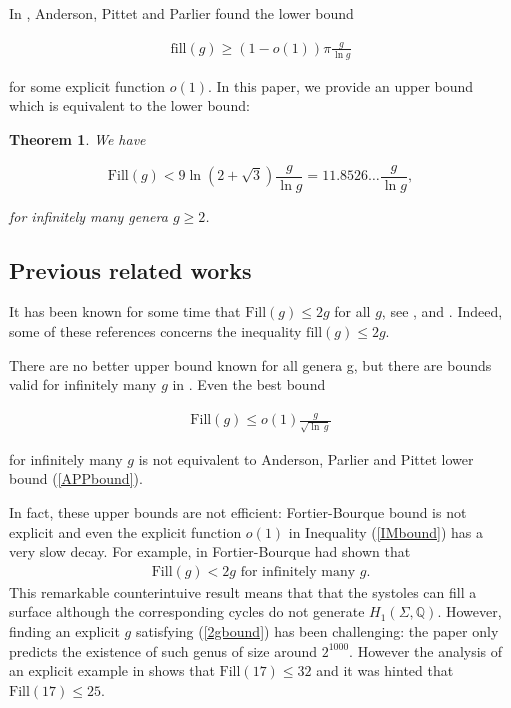 \documentclass[12pt]{amsart}
\newcommand{\Q}{\mathbb{Q}}
\renewcommand{\fill}{\mathrm{fill}}
\newcommand{\Fill}{\mathrm{Fill}}
\newtheorem{thm}[lemma]{Theorem}
\begin{document}
In \cite{APP}, Anderson, Pittet and Parlier found the lower bound
 
\begin{align}
\fill(g)\geq (1-o(1)) \pi \frac{g}{\ln g} \label{APPbound}
\end{align}

\noindent for some explicit function $o(1)$. In this
paper, we provide an upper bound which is equivalent to the lower bound:

\begin{thm}\label{main} We have

$$\Fill(g)<9\ln(2+\sqrt{3}) \frac{g}{\ln g}=11.8526\ldots \frac{g}{\ln g},$$

for infinitely many genera $g\geq 2$.
\end{thm}


\subsection*{{ Previous related works}}

It has been known for some time that  $\Fill(g)\leq 2g$ for all $g$,
see \cite{SS},\cite{APP} and \cite{Sanki}. Indeed,   some of these references concerns the inequality  
$\fill(g)\leq 2g$.  

There are no better upper  bound known for all genera g, but there are
bounds valid for infinitely many $g$ in \cite{FB20}\cite{IM}\cite{Mathieu}.
Even the best bound 
 
\begin{align}
\Fill(g)\leq o(1) \frac{g}{\sqrt{\ln\,g}}\label{IMbound}
\end{align}
 
 \noindent for infinitely many $g$ is not equivalent to
Anderson, Parlier and Pittet lower bound (\ref{APPbound}). 

In fact, these upper bounds are not efficient: Fortier-Bourque bound
\cite{FB20} is not explicit and even
the explicit function  $o(1)$ in Inequality (\ref{IMbound}) has a very slow decay.
For example, in \cite{FB20} Fortier-Bourque  had shown that 
\begin{align}
\Fill(g)<2g \text{ for infinitely many } g. \label{2gbound}
\end{align}
This remarkable counterintuive result means that
 that the systoles can fill a surface although
the corresponding cycles  do not generate $H_1(\Sigma, \Q)$.
However, finding an explicit $g$ satisfying (\ref{2gbound}) has been challenging: the paper
 \cite{IM} only predicts the existence of such genus of size around $2^{1000}$. However  the analysis of an explicit example in \cite{Mathieu} shows 
that $\Fill(17)\leq 32$ and it was hinted that $\Fill(17)\leq 25$.
\end{document}

